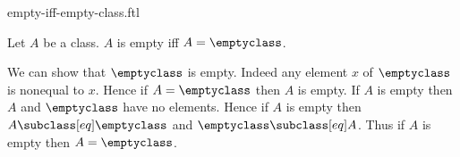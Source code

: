 \documentclass{article}
\begin{document}
\begin{smodule}[creators={Marcel Schütz}]{empty-iff-empty-class.ftl}

  \begin{fproposition*}[label=2263153161273344]
    Let $A$ be a class.
    $A$ is empty iff $A = \emptyclass$.
  \end{fproposition*}
  \begin{fproof}
    We can show that $\emptyclass$ is empty.
    Indeed any element $x$ of $\emptyclass$ is nonequal to $x$.
    Hence if $A = \emptyclass$ then $A$ is empty.
    If $A$ is empty then $A$ and $\emptyclass$ have no elements.
    Hence if $A$ is empty then $A \subclass[eq] \emptyclass$ and
    $\emptyclass \subclass[eq] A$.
    Thus if $A$ is empty then $A = \emptyclass$.
  \end{fproof}
\end{smodule}
\end{document}
